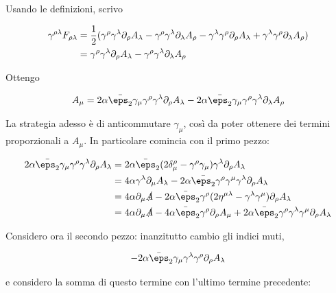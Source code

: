 \documentclass{report}
\begin{document}
Usando le definizioni, scrivo 

\begin{align}
    \gamma^{\rho\lambda}F_{\rho\lambda} &= \frac{1}{2}(\gamma^\rho\gamma^\lambda \partial_\rho A_\lambda - \gamma^\rho\gamma^\lambda \partial_\lambda A_\rho - \gamma^\lambda\gamma^\rho \partial_\rho A_\lambda + \gamma^\lambda\gamma^\rho \partial_\lambda A_\rho) \notag \\ 
    &= \gamma^\rho \gamma^\lambda \partial_\rho A_\lambda - \gamma^\rho \gamma^\lambda \partial_\lambda A_\rho 
\end{align}

Ottengo 

\begin{align}
    [\delta_{\eps_1}, \delta_{\eps_2}]A_\mu = 2\alpha \bar{\eps_2} \gamma_\mu \gamma^\rho \gamma^\lambda \partial_\rho A_\lambda - 2\alpha \bar{\eps_2} \gamma_\mu \gamma^\rho \gamma^\lambda \partial_\lambda A_\rho  
\end{align}

La strategia adesso è di anticommutare \(\gamma_\mu\), così da poter ottenere dei termini proporzionali a \(A_\mu\). In particolare comincia con il primo pezzo: 

\begin{align}
    2\alpha \bar{\eps_2} \gamma_\mu \gamma^\rho \gamma^\lambda \partial_\rho A_\lambda &= 2\alpha \bar{\eps}_2 (2\delta^\rho_\mu - \gamma^\rho \gamma_\mu)\gamma^\lambda \partial_\rho A_\lambda \notag \\ 
    &= 4\alpha \gamma^\lambda \partial_\mu A_\lambda - 2\alpha \bar{\eps_2} \gamma^\rho \gamma^\mu \gamma^\lambda \partial_\rho A_\lambda \notag \\ 
    &= 4\alpha \partial_\mu \slashed{A} - 2\alpha\bar{\eps}_2\gamma^\rho (2\eta^{\mu\lambda} - \gamma^\lambda \gamma^\mu)\partial_\rho A_\lambda \notag \\ 
    &= 4\alpha \partial_\mu \slashed{A} -4\alpha\bar{\eps}_2 \gamma^\rho \partial_\rho A_\mu + 2\alpha \bar{\eps}_2 \gamma^\rho \gamma^\lambda \gamma^\mu \partial_\rho A_\lambda
\end{align}

Considero ora il secondo pezzo: inanzitutto cambio gli indici muti, 

\begin{align}
    -2\alpha \bar{\eps}_2 \gamma_\mu \gamma^\lambda \gamma^\rho \partial_\rho A_\lambda 
\end{align}

e considero la somma di questo termine con l'ultimo termine precedente: 
\end{document}
